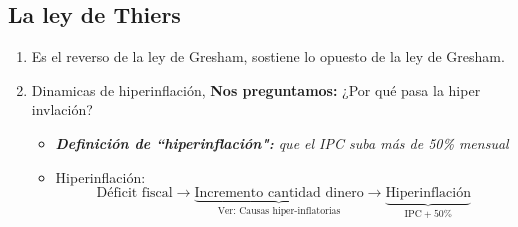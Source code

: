 
\subsection{La ley de Thiers}
\begin{enumerate}
    \item Es el reverso de la ley de Gresham, sostiene lo opuesto de la ley de Gresham.
    \item Dinamicas de hiperinflación, \textbf{Nos preguntamos:} ¿Por qué pasa la hiper invlación?
        \begin{itemize}
            \item \emph{\textbf{Definición de ``hiperinflación":} que el IPC suba más de 50\% mensual}
            \item  Hiperinflación:
                \[
                    \text{Déficit fiscal} \longrightarrow \underbrace{\text{Incremento cantidad dinero}}_{\text{Ver: Causas hiper-inflatorias}} \longrightarrow \underbrace{\text{Hiperinflación}}_{\text{IPC} + 50\%} 
                \]


\end{itemize}
\end{enumerate}

